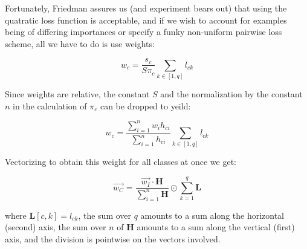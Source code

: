 \documentclass[12pt]{article}
\begin{document}
Fortunately, Friedman assures us (and experiment bears out) that using the quatratic loss function is acceptable, and if we wish to account for examples being of differing importances or specify a funky non-uniform pairwise loss scheme, all we have to do is use weights:

$$w_c = \frac{s_c}{S \pi_c} \sum_{k \in [1,q]} l_{ck}$$

Since weights are relative, the constant $S$ and the normalization by the constant $n$ in the calculation of $\pi_c$ can be dropped to yeild:

$$w_c = \frac{\sum_{i=1}^n w_i h_{ci}}{\sum_{i=1}^n h_{ci}} \sum_{k \in [1,q]} l_{ck}$$

Vectorizing to obtain this weight for all classes at once we get:

$$\vec{w_C} = \frac{\vec{w_I} \cdot \pmb{H}}{\sum_{i=1}^n \pmb{H}} \odot \sum_{k=1}^q \pmb{L}$$

where $\pmb{L}[c,k] = l_{ck}$, the sum over $q$ amounts to a sum along the horizontal (second) axis, the sum over $n$ of $\pmb{H}$ amounts to a sum along the vertical (first) axis, and the division is pointwise on the vectors involved.
\end{document}
